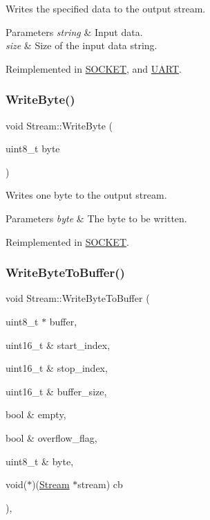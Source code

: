 Writes the specified data to the output stream. 
\begin{DoxyParams}{Parameters}
{\em string} & Input data. \\
\hline
{\em size} & Size of the input data string. \\
\hline
\end{DoxyParams}


Reimplemented in \hyperlink{class_s_o_c_k_e_t_ad8ee6b81c9f30267406412a95264abed}{S\+O\+C\+K\+ET}, and \hyperlink{class_u_a_r_t_a8bb77ca27b4e17d608d2743313625ac4}{U\+A\+RT}.

\hypertarget{class_stream_aeaed767b3a8d946c6f81465fa83ff17f}{}\label{class_stream_aeaed767b3a8d946c6f81465fa83ff17f} 
\subsubsection{\texorpdfstring{Write\+Byte()}{WriteByte()}}
{\footnotesize\ttfamily void Stream\+::\+Write\+Byte (\begin{DoxyParamCaption}\item[{uint8\+\_\+t}]{byte }\end{DoxyParamCaption})\hspace{0.3cm}{\ttfamily [virtual]}}

Writes one byte to the output stream. 
\begin{DoxyParams}{Parameters}
{\em byte} & The byte to be written. \\
\hline
\end{DoxyParams}


Reimplemented in \hyperlink{class_s_o_c_k_e_t_abcddb460b7adf3595a813f08f3659356}{S\+O\+C\+K\+ET}.

\hypertarget{class_stream_a7b6a9a1f96e0f524e950863215128911}{}\label{class_stream_a7b6a9a1f96e0f524e950863215128911} 
\subsubsection{\texorpdfstring{Write\+Byte\+To\+Buffer()}{WriteByteToBuffer()}}
{\footnotesize\ttfamily void Stream\+::\+Write\+Byte\+To\+Buffer (\begin{DoxyParamCaption}\item[{uint8\+\_\+t $\ast$}]{buffer,  }\item[{uint16\+\_\+t \&}]{start\+\_\+index,  }\item[{uint16\+\_\+t \&}]{stop\+\_\+index,  }\item[{uint16\+\_\+t \&}]{buffer\+\_\+size,  }\item[{bool \&}]{empty,  }\item[{bool \&}]{overflow\+\_\+flag,  }\item[{uint8\+\_\+t \&}]{byte,  }\item[{void($\ast$)(\hyperlink{class_stream}{Stream} $\ast$stream)}]{cb }\end{DoxyParamCaption})\hspace{0.3cm}{\ttfamily [protected]}, {\ttfamily [virtual]}}

